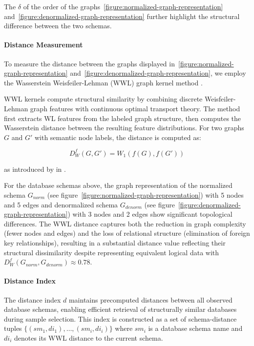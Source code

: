 The $\delta$ of the order of the graphs~\ref{figure:normalized-graph-representation}
and~\ref{figure:denormalized-graph-representation}
further highlight the structural difference between the two schemas.

\paragraph{Distance Measurement}

To measure the distance between the graphs displayed in~\ref{figure:normalized-graph-representation}
and~\ref{figure:denormalized-graph-representation}, we employ the
Wasserstein Weisfeiler-Lehman (WWL) graph kernel method \citep{WWL}.

WWL kernels compute structural similarity by combining discrete Weisfeiler-Lehman
graph features with continuous optimal transport theory. The method first extracts
WL features from the labeled graph structure, then computes the Wasserstein distance
between the resulting feature distributions. For two graphs $G$ and
$G'$ with semantic node labels, the distance is computed as:

\begin{equation}
D^{f}_{W}(G, G') = W_1(f(G), f(G'))
\end{equation}

as introduced by \citeauthor{WWL} in \citeyear{WWL}.

For the database schemas above, the graph representation of the normalized
schema $G_{norm}$ (see figure~\ref{figure:normalized-graph-representation})
with 5 nodes and 5 edges and denormalized schema $G_{denorm}$ (see figure~\ref{figure:denormalized-graph-representation})
with 3 nodes and 2 edges show significant topological differences.
The WWL distance captures both the reduction in graph complexity (fewer nodes and edges)
and the loss of relational structure (elimination of foreign key relationships),
resulting in a substantial distance value reflecting their structural dissimilarity
despite representing equivalent logical data with $D^{f}_{W}(G_{norm}, G_{denorm}) \approx 0.78$.


\paragraph{Distance Index}

The distance index $d$ maintains precomputed distances between
all observed database schemas, enabling efficient retrieval of structurally similar
databases during sample selection. This index is constructed as a set of
schema-distance tuples $\{(sm_1, di_1), \ldots, (sm_i, di_i)\}$ where $sm_i$ is
a database schema name and $di_i$ denotes its WWL distance to the current schema.

